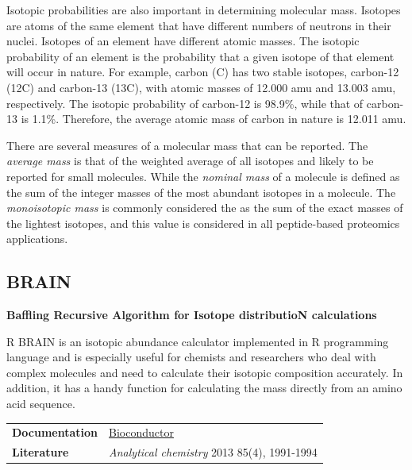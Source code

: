 \documentclass[
]{book}
\begin{document}
Isotopic probabilities are also important in determining molecular mass. Isotopes are atoms of the same element that have different numbers of neutrons in their nuclei. Isotopes of an element have different atomic masses. The isotopic probability of an element is the probability that a given isotope of that element will occur in nature. For example, carbon (C) has two stable isotopes, carbon-12 (12C) and carbon-13 (13C), with atomic masses of 12.000 amu and 13.003 amu, respectively. The isotopic probability of carbon-12 is 98.9\%, while that of carbon-13 is 1.1\%. Therefore, the average atomic mass of carbon in nature is 12.011 amu.

There are several measures of a molecular mass that can be reported. The \emph{average mass} is that of the weighted average of all isotopes and likely to be reported for small molecules. While the \emph{nominal mass} of a molecule is defined as the sum of the integer masses of the most abundant isotopes in a molecule. The \emph{monoisotopic mass} is commonly considered the as the sum of the exact masses of the lightest isotopes, and this value is considered in all peptide-based proteomics applications.

\hypertarget{brain}{%
\subsection*{BRAIN}\label{brain}}

\textbf{Baffling Recursive Algorithm for Isotope distributioN calculations}

R BRAIN is an isotopic abundance calculator implemented in R programming language and is especially useful for chemists and researchers who deal with complex molecules and need to calculate their isotopic composition accurately. In addition, it has a handy function for calculating the mass directly from an amino acid sequence.

\begin{longtable}[]{@{}
  >{\raggedright\arraybackslash}p{}
  >{\raggedright\arraybackslash}p{}@{}}
\toprule\noalign{}
\endhead
\bottomrule\noalign{}
\endlastfoot
\textbf{Documentation} & \href{https://bioconductor.org/packages/release/bioc/manuals/BRAIN/man/BRAIN.pdf}{Bioconductor} \\
\textbf{Literature} & \emph{Analytical chemistry} 2013 85(4), 1991-1994 \\
\end{longtable}
\end{document}
